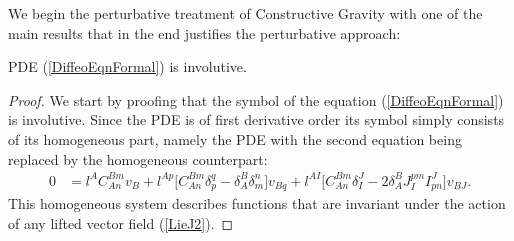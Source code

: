 We begin the perturbative treatment of Constructive Gravity with one of the main results that in the end justifies the perturbative approach:
\begin{theorem}
PDE (\ref{DiffeoEqnFormal}) is involutive.
\end{theorem}
\begin{proof}
We start by proofing that the symbol of the equation (\ref{DiffeoEqnFormal}) is involutive. Since the PDE is of first derivative order its symbol simply consists of its homogeneous part, namely the PDE with the second equation being replaced by the homogeneous counterpart:
\begin{align}
    0 &= l^{A} C_{An}^{Bm} v_B + l^{Ap} \bigl[ C_{An}^{Bm} \delta_p^q - \delta_A^B \delta_m^n \bigr] v_{Bq} + l^{AI} \bigl[ C_{An}^{Bm} \delta_I^J - 2 \delta_A^B J_I^{pm} I^J_{pn}  \bigr] v_{BJ}.
\end{align}
This homogeneous system describes functions that are invariant under the action of any lifted vector field (\ref{LieJ2}). 


\end{proof}
